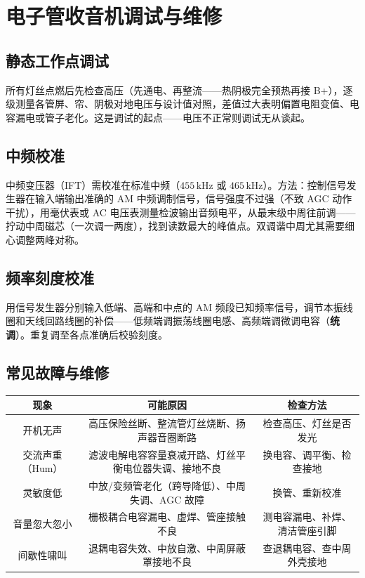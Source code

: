 \documentclass[12pt,UTF8]{ctexbook}
\begin{document}
\section{电子管收音机调试与维修}
\label{sec:tube_radio_maintenance}

\subsection{静态工作点调试}

所有灯丝点燃后先检查高压（先通电、再整流——热阴极完全预热再接 B+），逐级测量各管屏、帘、阴极对地电压与设计值对照，差值过大表明偏置电阻变值、电容漏电或管子老化。这是调试的起点——电压不正常则调试无从谈起。

\subsection{中频校准}

中频变压器（IFT）需校准在标准中频（$455\,\mathrm{kHz}$ 或 $465\,\mathrm{kHz}$）。方法：控制信号发生器在输入端输出准确的 AM 中频调制信号，信号强度不过强（不致 AGC 动作干扰），用毫伏表或 AC 电压表测量检波输出音频电平，从最末级中周往前调——拧动中周磁芯（一次调一两度），找到读数最大的峰值点。双调谐中周尤其需要细心调整两峰对称。

\subsection{频率刻度校准}

用信号发生器分别输入低端、高端和中点的 AM 频段已知频率信号，调节本振线圈和天线回路线圈的补偿——低频端调振荡线圈电感、高频端调微调电容（\textbf{统调}）。重复调至各点准确后校验刻度。

\subsection{常见故障与维修}

\begin{center}
\begin{tabular}{c|c|c}
\hline
\textbf{现象} & \textbf{可能原因} & \textbf{检查方法} \\
\hline
开机无声 & 高压保险丝断、整流管灯丝烧断、扬声器音圈断路 & 检查高压、灯丝是否发光 \\
\hline
交流声重（Hum） & 滤波电解电容容量衰减开路、灯丝平衡电位器失调、接地不良 & 换电容、调平衡、检查接地 \\
\hline
灵敏度低 & 中放/变频管老化（跨导降低）、中周失调、AGC 故障 & 换管、重新校准 \\
\hline
音量忽大忽小 & 栅极耦合电容漏电、虚焊、管座接触不良 & 测电容漏电、补焊、清洁管座引脚 \\
\hline
间歇性啸叫 & 退耦电容失效、中放自激、中周屏蔽罩接地不良 & 查退耦电容、查中周外壳接地 \\
\hline
\end{tabular}
\end{center}
\end{document}
